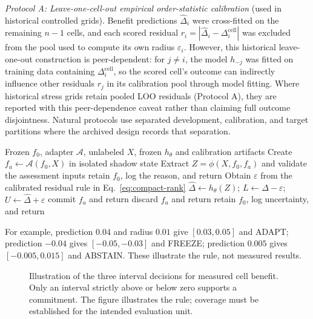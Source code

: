 \emph{Protocol A: Leave-one-cell-out empirical order-statistic calibration} (used in historical controlled grids). Benefit predictions $\widehat\Delta_i$ were cross-fitted on the remaining $n-1$ cells, and each scored residual $r_i = |\widehat\Delta_i - \Delta_i^{\mathrm{cell}}|$ was excluded from the pool used to compute its own radius $\varepsilon_i$. However, this historical leave-one-out construction is peer-dependent: for $j \neq i$, the model $h_{-j}$ was fitted on training data containing $\Delta_i^{\mathrm{cell}}$, so the scored cell's outcome can indirectly influence other residuals $r_j$ in its calibration pool through model fitting.
Where historical stress grids retain pooled LOO residuals (Protocol A), they are reported with this peer-dependence caveat rather than claiming full outcome disjointness. Natural protocols use separated development, calibration, and target partitions where the archived design records that separation.

\begin{algorithm}[t]
\caption{KGA for one proposed update}
\label{alg:compact-kga}
\begin{algorithmic}[1]
\Require Frozen $f_0$, adapter $\mathcal A$, unlabeled $X$, frozen $h_\theta$ and calibration artifacts
\State Create $f_a\leftarrow\mathcal A(f_0,X)$ in isolated shadow state
\State Extract $Z=\phi(X,f_0,f_a)$ and validate the assessment inputs
  \State retain $f_0$, log the reason, and return \abstain
\EndIf
\State Obtain $\varepsilon$ from the calibrated residual rule in Eq.~\eqref{eq:compact-rank}
\State $\widehat\Delta\leftarrow h_\theta(Z)$; $L\leftarrow\widehat\Delta-\varepsilon$; $U\leftarrow\widehat\Delta+\varepsilon$
 \State commit $f_a$ and return \adapt
{} \State discard $f_a$ and return \freeze
\Else \State retain $f_0$, log uncertainty, and return \abstain
\EndIf
\end{algorithmic}
\end{algorithm}

For example, prediction $0.04$ and radius $0.01$ give $[0.03,0.05]$ and ADAPT; prediction
$-0.04$ gives $[-0.05,-0.03]$ and FREEZE; prediction $0.005$ gives $[-0.005,0.015]$ and ABSTAIN.
These illustrate the rule, not measured results.

\begin{figure}[t]
\centering
{}
\caption{Illustration of the three interval decisions for measured cell benefit. Only an interval
strictly above or below zero supports a commitment. The figure illustrates the rule; coverage
must be established for the intended evaluation unit.}
\label{fig:compact-certificate}
\end{figure}


